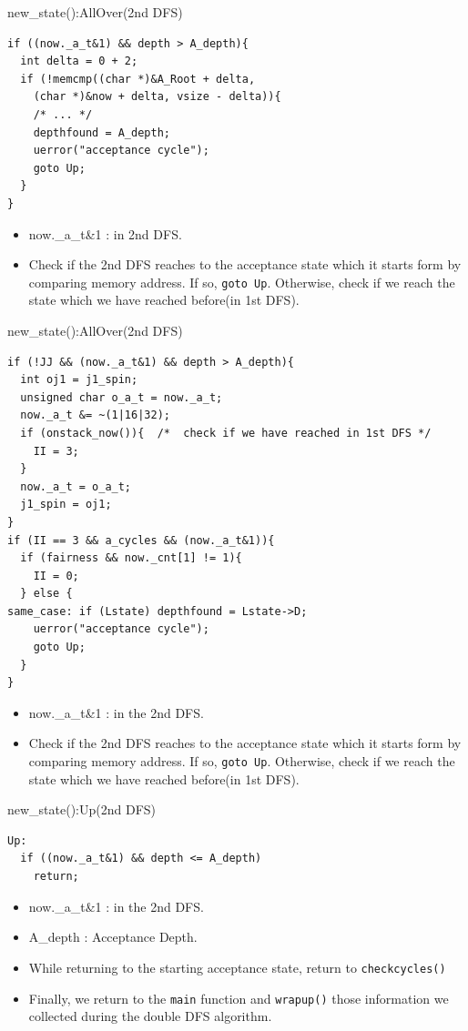 \documentclass[12pt]{beamer}
\newcommand{\code}[1]{\texttt{#1}}
\begin{document}
\begin{frame}[fragile]{new\_state():AllOver(2nd DFS)}
\begin{lstlisting}[basicstyle=\footnotesize\ttfamily]
if ((now._a_t&1) && depth > A_depth){
  int delta = 0 + 2;
  if (!memcmp((char *)&A_Root + delta,
    (char *)&now + delta, vsize - delta)){
    /* ... */
    depthfound = A_depth;
    uerror("acceptance cycle");
    goto Up;
  }
}
\end{lstlisting}
\begin{itemize}
	\item now.\_a\_t\&1 : in 2nd DFS.
	\item Check if the 2nd DFS reaches to the acceptance state which it starts form by comparing memory address. If so, \code{goto Up}. Otherwise, check if we reach the state which we have reached before(in 1st DFS).
\end{itemize}
\end{frame}

\begin{frame}[fragile]{new\_state():AllOver(2nd DFS)}
\begin{lstlisting}[basicstyle=\footnotesize\ttfamily]
if (!JJ && (now._a_t&1) && depth > A_depth){
  int oj1 = j1_spin;
  unsigned char o_a_t = now._a_t;
  now._a_t &= ~(1|16|32);
  if (onstack_now()){  /*  check if we have reached in 1st DFS */
    II = 3;
  }
  now._a_t = o_a_t;
  j1_spin = oj1;
}
if (II == 3 && a_cycles && (now._a_t&1)){
  if (fairness && now._cnt[1] != 1){
    II = 0;
  } else {
same_case: if (Lstate) depthfound = Lstate->D;
    uerror("acceptance cycle");
    goto Up;
  }
}
\end{lstlisting}
\begin{itemize}
	\item now.\_a\_t\&1 : in the 2nd DFS.
	\item Check if the 2nd DFS reaches to the acceptance state which it starts form by comparing memory address. If so, \code{goto Up}. Otherwise, check if we reach the state which we have reached before(in 1st DFS).
\end{itemize}
\end{frame}

\begin{frame}[fragile]{new\_state():Up(2nd DFS)}
\begin{lstlisting}[basicstyle=\footnotesize\ttfamily]
Up:
  if ((now._a_t&1) && depth <= A_depth)
    return;
\end{lstlisting}
\begin{itemize}
	\item now.\_a\_t\&1 : in the 2nd DFS.
	\item A\_depth : Acceptance Depth.
	\item While returning to the starting acceptance state, return to \code{checkcycles()}
	\item Finally, we return to the \code{main} function and \code{wrapup()} those information we collected during the double DFS algorithm.
\end{itemize}
\end{frame}
\end{document}

